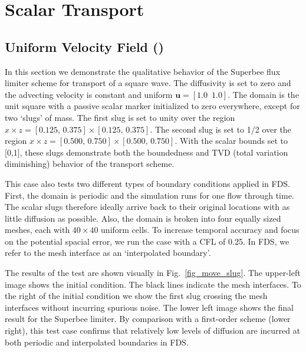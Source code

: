 \documentclass[11pt]{book}
\begin{document}
\section{Scalar Transport}

\subsection{Uniform Velocity Field (\texorpdfstring{}{move\_slug})}

In this section we demonstrate the qualitative behavior of the Superbee flux limiter scheme for transport of a square wave.
The diffusivity is set to zero and the advecting velocity is constant and uniform $\mathbf{u} = [1.0\,\,\,1.0]$.
The domain is the unit square with a passive scalar marker initialized to zero everywhere, except for two `slugs' of mass.
The first slug is set to unity over the region $x \times z = [0.125,\,0.375] \times [0.125,\,0.375]$.
The second slug is set to 1/2 over the region $x \times z = [0.500,\,0.750] \times [0.500,\,0.750]$.
With the scalar bounds set to [0,1], these slugs demonstrate both the boundedness and TVD (total variation diminishing) behavior of the transport scheme.

This case also tests two different types of boundary conditions applied in FDS.  First, the domain is periodic and the simulation runs for one flow through time. The scalar slugs therefore ideally arrive back to their original locations with as little diffusion as possible.
Also, the domain is broken into four equally sized meshes, each with $40 \times 40$ uniform cells. To increase temporal accuracy and focus on the potential spacial error, we run the case with a CFL of 0.25.  In FDS, we refer to the mesh interface as an `interpolated boundary'.

The results of the test are shown visually in Fig.~\ref{fig_move_slug}.  The upper-left image shows the initial condition.
The black lines indicate the mesh interfaces.  To the right of the initial condition we show the first slug crossing the mesh interfaces without incurring spurious noise. The lower left image shows the final result for the Superbee limiter.  By comparison with a first-order scheme (lower right), this test case confirms that relatively low levels of diffusion are incurred at both periodic and interpolated boundaries in FDS.
\end{document}
